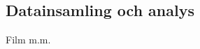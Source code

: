 \documentclass[../rapport_MVEX01-11-05]{subfiles}
\begin{document}
\subsection{Datainsamling och analys}
Film m.m.
\end{document}
